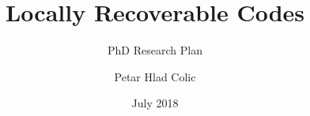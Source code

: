\documentclass[envcountsect]{beamer}
\title{Locally Recoverable Codes}
\subtitle{PhD Research Plan}
\author{Petar Hlad Colic}
\institute{Department of Network Engineering \\ Universitat Polit\`ecnica de Catalunya}
\date{July 2018}
\begin{document}
    \frame{\titlepage}
    
    \frame{\tableofcontents}
    
    
    
     
    
   
    
    
\end{document}
